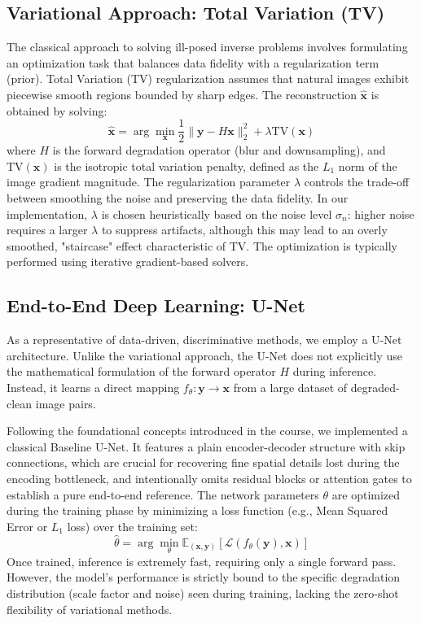 \documentclass[10pt,journal,compsoc]{IEEEtran}
\begin{document}
\subsection{Variational Approach: Total Variation (TV)}
The classical approach to solving ill-posed inverse problems involves formulating an optimization task that balances data fidelity with a regularization term (prior). Total Variation (TV) regularization assumes that natural images exhibit piecewise smooth regions bounded by sharp edges. The reconstruction $\mathbf{\hat{x}}$ is obtained by solving:
\begin{equation}
    \mathbf{\hat{x}} = \arg\min_{\mathbf{x}} \frac{1}{2} \| \mathbf{y} - H\mathbf{x} \|_2^2 + \lambda \text{TV}(\mathbf{x})
\end{equation}
where $H$ is the forward degradation operator (blur and downsampling), and $\text{TV}(\mathbf{x})$ is the isotropic total variation penalty, defined as the $L_1$ norm of the image gradient magnitude. The regularization parameter $\lambda$ controls the trade-off between smoothing the noise and preserving the data fidelity. In our implementation, $\lambda$ is chosen heuristically based on the noise level $\sigma_n$: higher noise requires a larger $\lambda$ to suppress artifacts, although this may lead to an overly smoothed, "staircase" effect characteristic of TV. The optimization is typically performed using iterative gradient-based solvers.

\subsection{End-to-End Deep Learning: U-Net}
As a representative of data-driven, discriminative methods, we employ a U-Net architecture. Unlike the variational approach, the U-Net does not explicitly use the mathematical formulation of the forward operator $H$ during inference. Instead, it learns a direct mapping $f_\theta: \mathbf{y} \rightarrow \mathbf{x}$ from a large dataset of degraded-clean image pairs.

Following the foundational concepts introduced in the course, we implemented a classical Baseline U-Net. It features a plain encoder-decoder structure with skip connections, which are crucial for recovering fine spatial details lost during the encoding bottleneck, and intentionally omits residual blocks or attention gates to establish a pure end-to-end reference. The network parameters $\theta$ are optimized during the training phase by minimizing a loss function (e.g., Mean Squared Error or $L_1$ loss) over the training set:
\begin{equation}
    \hat{\theta} = \arg\min_{\theta} \mathbb{E}_{(\mathbf{x}, \mathbf{y})} \left[ \mathcal{L}(f_\theta(\mathbf{y}), \mathbf{x}) \right]
\end{equation}
Once trained, inference is extremely fast, requiring only a single forward pass. However, the model's performance is strictly bound to the specific degradation distribution (scale factor and noise) seen during training, lacking the zero-shot flexibility of variational methods.
\end{document}
